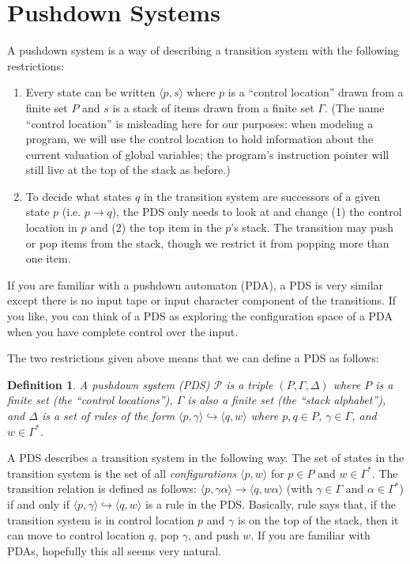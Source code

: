 \documentclass{article}
\newcommand{\Config}[2]{\ensuremath{\langle #1, #2 \rangle}}
\newcommand{\Rule}[2]{\ensuremath{#1 \hookrightarrow #2}}
\newtheorem{definition}{Definition}
\begin{document}
\section{Pushdown Systems}

A pushdown system is a way of describing a transition system with the
following restrictions:
\begin{enumerate}

\item Every state can be written \Config{p}{s} where $p$ is a
  ``control location'' drawn from a finite set $P$ and $s$ is a stack
  of items drawn from a finite set $\Gamma$. (The name ``control
  location'' is misleading here for our purposes: when modeling a
  program, we will use the control location to hold information about
  the current valuation of global variables; the program's instruction
  pointer will still live at the top of the stack as before.)

\item To decide what states $q$ in the transition system are
  successors of a given state $p$ (i.e. $p \rightarrow q$), the PDS
  only needs to look at and change (1) the control location in $p$
  and (2) the top item in the $p$'s stack. The transition may push or
  pop items from the stack, though we restrict it from popping more
  than one item.
\end{enumerate}

If you are familiar with a pushdown automaton (PDA), a PDS is very
similar except there is no input tape or input character component of
the transitions. If you like, you can think of a PDS as exploring the
configuration space of a PDA when you have complete control over the
input.

The two restrictions given above means that we can define a PDS as
follows:

\begin{definition}
  A pushdown system (PDS) $\mathcal{P}$ is a triple $(P, \Gamma,
  \Delta)$ where $P$ is a finite set (the ``control locations''),
  $\Gamma$ is also a finite set (the ``stack alphabet''), and $\Delta$
  is a set of rules of the form
  \Rule{\Config{p}{\gamma}}{\Config{q}{w}} where $p, q \in P$, $\gamma
  \in \Gamma$, and $w \in \Gamma^*$.
\end{definition}

A PDS describes a transition system in the following way. The set of
states in the transition system is the set of all
\emph{configurations} \Config{p}{w} for $p \in P$ and $w \in
\Gamma^*$. The transition relation is defined as follows:
$\Config{p}{\gamma\alpha} \rightarrow \Config{q}{w\alpha}$ (with
$\gamma \in \Gamma$ and $\alpha \in \Gamma^*$) if and only if
$\Rule{\Config{p}{\gamma}}{\Config{q}{w}}$ is a rule in the
PDS. Basically, rule says that, if the transition system is in control
location $p$ and $\gamma$ is on the top of the stack, then it can move
to control location $q$, pop $\gamma$, and push $w$. If you are
familiar with PDAs, hopefully this all seems very natural.
\end{document}
